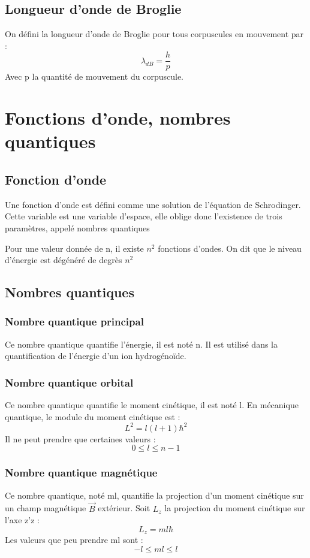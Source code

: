 \section{Longueur d'onde de Broglie}
\begin{de}
 On défini la longueur d'onde de Broglie pour tous corpuscules en mouvement par :
$$\lambda_{dB} = \dfrac{h}{p}$$
Avec p la quantité de mouvement du corpuscule.
\end{de}
\chapter{Fonctions d'onde, nombres quantiques}
\section{Fonction d'onde}
\begin{de}
 Une fonction d'onde est défini comme une solution de l'équation de Schrodinger. Cette variable est une variable d'espace, elle oblige donc l'existence de trois paramètres, appelé nombres quantiques
\end{de}
Pour une valeur donnée de n, il existe $n^2$ fonctions d'ondes. On dit que le niveau d'énergie est dégénéré de degrès $n^2$
\section{Nombres quantiques}
\subsection{Nombre quantique principal}
Ce nombre quantique quantifie l'énergie, il est noté n. Il est utilisé dans la quantification de l'énergie d'un ion hydrogénoïde.
\subsection{Nombre quantique orbital}
Ce nombre quantique quantifie le moment cinétique, il est noté l. En mécanique quantique, le module du moment cinétique est : 
$$L^2=l(l+1)\hbar^2$$
Il ne peut prendre que certaines valeurs :
$$0 \leq l \leq n-1$$
\subsection{Nombre quantique magnétique}
Ce nombre quantique, noté ml, quantifie la projection d'un moment cinétique sur un champ magnétique $\vec B$ extérieur. Soit $L_z$ la projection du moment cinétique sur l'axe z'z : 
$$L_z = ml\hbar$$
Les valeurs que peu prendre ml sont : 
$$-l \leq ml \leq l$$
